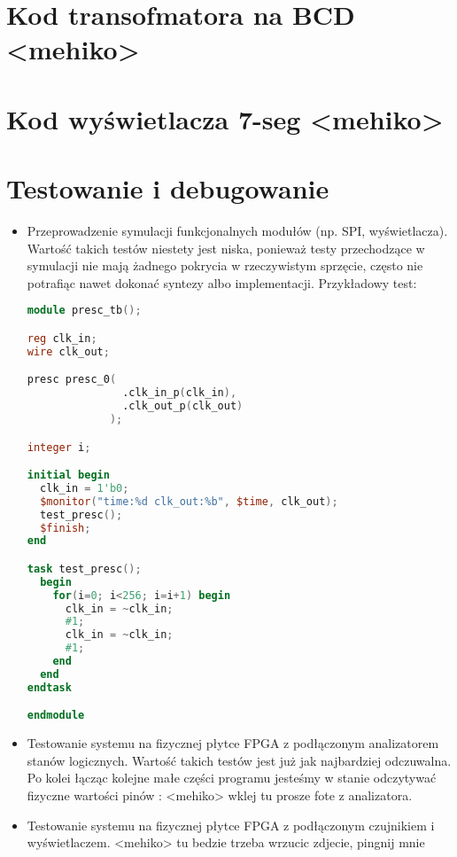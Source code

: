 \documentclass[a4paper,12pt]{article}
\begin{document}
\section{Kod transofmatora na BCD <mehiko>}

\section{Kod wyświetlacza 7-seg <mehiko>}

\section{Testowanie i debugowanie}
\begin{itemize}
    \item Przeprowadzenie symulacji funkcjonalnych modułów (np. SPI, wyświetlacza). \newline
    Wartość takich testów niestety jest niska, ponieważ testy przechodzące w symulacji nie mają żadnego pokrycia w rzeczywistym sprzęcie, często nie potrafiąc nawet dokonać syntezy albo implementacji. Przykładowy test:

\begin{lstlisting}[language=verilog]
 module presc_tb();

reg clk_in;
wire clk_out;

presc presc_0(
               .clk_in_p(clk_in),
               .clk_out_p(clk_out)
             );

integer i;

initial begin
  clk_in = 1'b0;
  $monitor("time:%d clk_out:%b", $time, clk_out);
  test_presc();
  $finish;
end

task test_presc();
  begin
    for(i=0; i<256; i=i+1) begin
      clk_in = ~clk_in;
      #1;
      clk_in = ~clk_in;
      #1;
    end
  end
endtask

endmodule

\end{lstlisting}

    \item Testowanie systemu na fizycznej płytce FPGA z podłączonym analizatorem stanów logicznych.
    Wartość takich testów jest już jak najbardziej odczuwalna. Po kolei łącząc kolejne małe części programu jesteśmy w stanie odczytywać fizyczne wartości pinów : <mehiko> wklej tu prosze fote z analizatora.
    \item Testowanie systemu na fizycznej płytce FPGA z podłączonym czujnikiem i wyświetlaczem.
    <mehiko> tu bedzie trzeba wrzucic zdjecie, pingnij mnie
\end{itemize}
\end{document}
